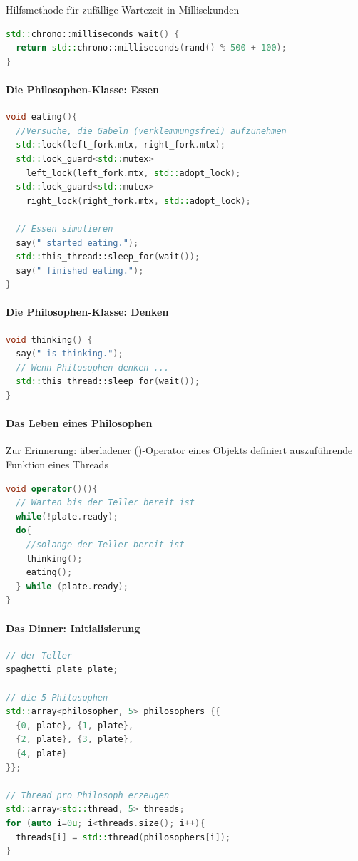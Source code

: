 \documentclass[10pt]{article}
\begin{document}
  Hilfsmethode für zufällige Wartezeit in Millisekunden
  \begin{lstlisting}[language=C++]
std::chrono::milliseconds wait() {
  return std::chrono::milliseconds(rand() % 500 + 100);
}
\end{lstlisting}
  
  \paragraph{Die Philosophen-Klasse: Essen}
  \begin{lstlisting}[language=C++]
void eating(){
  //Versuche, die Gabeln (verklemmungsfrei) aufzunehmen
  std::lock(left_fork.mtx, right_fork.mtx);
  std::lock_guard<std::mutex>
    left_lock(left_fork.mtx, std::adopt_lock);
  std::lock_guard<std::mutex>
    right_lock(right_fork.mtx, std::adopt_lock);
  
  // Essen simulieren
  say(" started eating.");
  std::this_thread::sleep_for(wait());
  say(" finished eating.");
}
\end{lstlisting}
  
  \paragraph{Die Philosophen-Klasse: Denken}
  \begin{lstlisting}[language=C++]
void thinking() {
  say(" is thinking.");
  // Wenn Philosophen denken ...
  std::this_thread::sleep_for(wait());
}
\end{lstlisting}
  
  \paragraph{Das Leben eines Philosophen}
  
  \begin{itemize*}
    \item Zur Erinnerung: überladener ()-Operator eines Objekts definiert auszuführende Funktion eines Threads
  \end{itemize*}
  \begin{lstlisting}[language=C++]
void operator()(){
  // Warten bis der Teller bereit ist
  while(!plate.ready);
  do{
    //solange der Teller bereit ist
    thinking();
    eating();
  } while (plate.ready);
}
\end{lstlisting}
  
  \paragraph{Das Dinner: Initialisierung}
  \begin{lstlisting}[language=C++]
// der Teller
spaghetti_plate plate;

// die 5 Philosophen
std::array<philosopher, 5> philosophers {{
  {0, plate}, {1, plate},
  {2, plate}, {3, plate},
  {4, plate}
}};

// Thread pro Philosoph erzeugen
std::array<std::thread, 5> threads;
for (auto i=0u; i<threads.size(); i++){
  threads[i] = std::thread(philosophers[i]);
}
\end{lstlisting}
  
\end{document}
